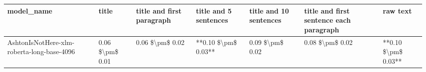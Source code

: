 \begin{tabular}{lllllll}
\toprule
                                model\_name &           title & title and first paragraph & title and 5 sentences & title and 10 sentences & title and first sentence each paragraph &            raw text \\
\midrule
AshtonIsNotHere-xlm-roberta-long-base-4096 & 0.06 \$\textbackslash pm\$ 0.01 &           0.06 \$\textbackslash pm\$ 0.02 &   **0.10 \$\textbackslash pm\$ 0.03** &        0.09 \$\textbackslash pm\$ 0.02 &                         0.08 \$\textbackslash pm\$ 0.02 & **0.10 \$\textbackslash pm\$ 0.03** \\
\bottomrule
\end{tabular}
